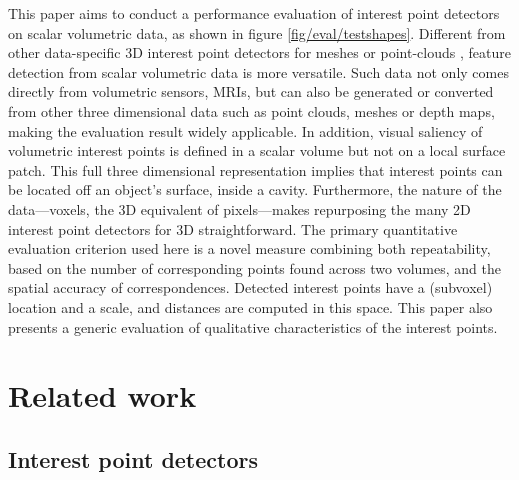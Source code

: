 This paper aims to conduct a performance evaluation of interest point detectors on scalar volumetric data, as shown in figure \ref{fig/eval/testshapes}. 
Different from other data-specific 3D interest point detectors for meshes \cite{Sipiran2011,Glomb2009,Zaharescu2009} or point-clouds \cite{Aanaes2012,Unnikrishnan2008}, feature detection from scalar volumetric data is more versatile. Such data not only comes directly from volumetric sensors, \eg MRIs, but can also be generated or converted from other three dimensional data such as point clouds, meshes or depth maps, making the evaluation result widely applicable.
In addition, visual saliency of volumetric interest points is defined in a scalar volume but not on a local surface patch. This full three dimensional representation implies that interest points can be located off an object's surface, \eg inside a cavity.
Furthermore, the nature of the data---voxels, the 3D equivalent of pixels---makes repurposing the many 2D interest point detectors for 3D straightforward. The primary quantitative evaluation criterion used here is a novel measure combining both repeatability, based on the number of corresponding points found across two volumes, and the spatial accuracy of correspondences. Detected interest points have a (subvoxel) location and a scale, and distances are computed in this space. This paper also presents a generic evaluation of qualitative characteristics of the interest points.

\section{Related work}
\label{sec/eval/relatedwork}

\subsection{Interest point detectors}


